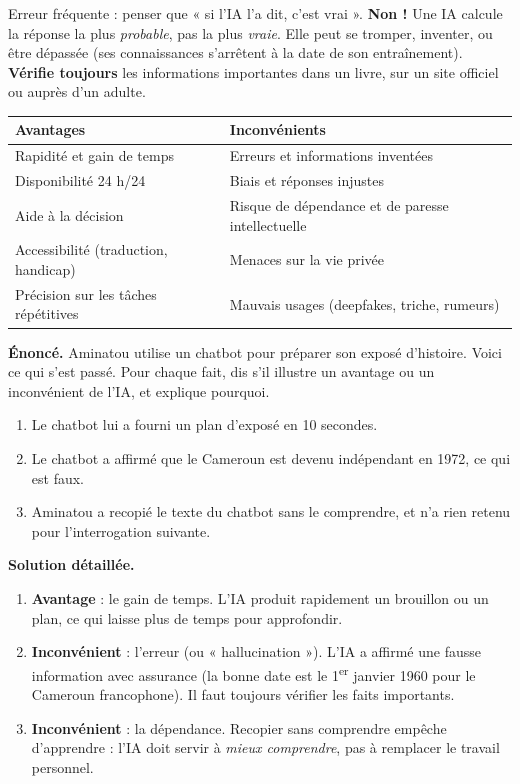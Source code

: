 \documentclass[11pt]{article}
\begin{document}
\begin{attention}
Erreur fréquente : penser que « si l'IA l'a dit, c'est vrai ». \textbf{Non !} Une IA calcule la réponse la plus \emph{probable}, pas la plus \emph{vraie}. Elle peut se tromper, inventer, ou être dépassée (ses connaissances s'arrêtent à la date de son entraînement). \textbf{Vérifie toujours} les informations importantes dans un livre, sur un site officiel ou auprès d'un adulte.
\end{attention}

\begin{center}
\begin{tabularx}{\linewidth}{|X|X|}
\hline
\rowcolor{popblueL} \textbf{Avantages} & \textbf{Inconvénients} \\
\hline
Rapidité et gain de temps & Erreurs et informations inventées \\
\hline
Disponibilité 24 h/24 & Biais et réponses injustes \\
\hline
Aide à la décision & Risque de dépendance et de paresse intellectuelle \\
\hline
Accessibilité (traduction, handicap) & Menaces sur la vie privée \\
\hline
Précision sur les tâches répétitives & Mauvais usages (deepfakes, triche, rumeurs) \\
\hline
\end{tabularx}
\end{center}

\begin{exoresolu}
\textbf{Énoncé.} Aminatou utilise un chatbot pour préparer son exposé d'histoire. Voici ce qui s'est passé. Pour chaque fait, dis s'il illustre un avantage ou un inconvénient de l'IA, et explique pourquoi.
\begin{enumerate}
\item Le chatbot lui a fourni un plan d'exposé en 10 secondes.
\item Le chatbot a affirmé que le Cameroun est devenu indépendant en 1972, ce qui est faux.
\item Aminatou a recopié le texte du chatbot sans le comprendre, et n'a rien retenu pour l'interrogation suivante.
\end{enumerate}
\tcblower
\textbf{Solution détaillée.}
\begin{enumerate}
\item \textbf{Avantage} : le gain de temps. L'IA produit rapidement un brouillon ou un plan, ce qui laisse plus de temps pour approfondir.
\item \textbf{Inconvénient} : l'erreur (ou « hallucination »). L'IA a affirmé une fausse information avec assurance (la bonne date est le 1\textsuperscript{er} janvier 1960 pour le Cameroun francophone). Il faut toujours vérifier les faits importants.
\item \textbf{Inconvénient} : la dépendance. Recopier sans comprendre empêche d'apprendre : l'IA doit servir à \emph{mieux comprendre}, pas à remplacer le travail personnel.
\end{enumerate}
\end{exoresolu}
\end{document}
